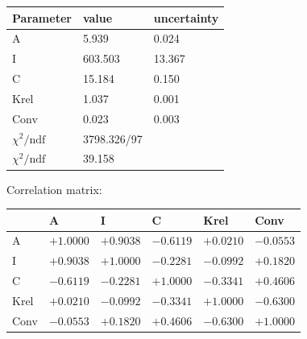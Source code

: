 \begin{tabular}{l|ll}
Parameter & value & uncertainty \\ \hline
 A & 5.939 & 0.024 \\ 
 I & 603.503 & 13.367 \\ 
 C & 15.184 & 0.150 \\ 
 Krel & 1.037 & 0.001 \\ 
 Conv & 0.023 & 0.003 \\ 
 \hline
 $\chi^2/\mathrm{ndf}$ & 3798.326/97 & \\
 $\chi^2/\mathrm{ndf}$ & 39.158 & \\
\end{tabular}

Correlation matrix:

\begin{tabular}{l|lllll} 
 & A & I & C & Krel & Conv \\ \hline
 A & $+1.0000$ & $+0.9038$ & $-0.6119$ & $+0.0210$ & $-0.0553$ \\ 
 I & $+0.9038$ & $+1.0000$ & $-0.2281$ & $-0.0992$ & $+0.1820$ \\ 
 C & $-0.6119$ & $-0.2281$ & $+1.0000$ & $-0.3341$ & $+0.4606$ \\ 
 Krel & $+0.0210$ & $-0.0992$ & $-0.3341$ & $+1.0000$ & $-0.6300$ \\ 
 Conv & $-0.0553$ & $+0.1820$ & $+0.4606$ & $-0.6300$ & $+1.0000$ \\ 
\end{tabular}
